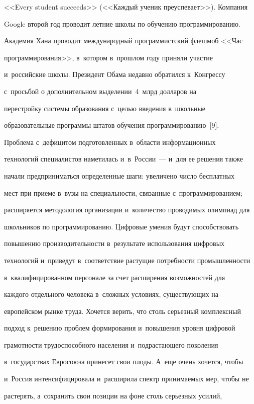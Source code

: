 <<Every student succeeds>> (<<Каждый ученик преуспевает>>). Компания 


Google второй год проводит летние школы по обучению программированию. 


Академия Хана проводит международный программистский флешмоб <<Час 


программирования>>, в~котором в~прошлом году приняли участие 


и~российские школы. Президент Обама недавно обратился к~Конгрессу 


с~просьбой о дополнительном выделении~4~млрд долларов на 


перестройку системы образования с~целью введения в~школьные 


образовательные программы штатов обучения программированию~[9]. 


Проблема с~дефицитом подготовленных в~области информационных 


технологий специалистов наметилась и~в~России~--- и~для ее решения также 


начали предприниматься определенные шаги: увеличено число бесплатных 


мест при приеме в~вузы на специальности, связанные с~программированием; 


расширяется методология организации и~количество проводимых олимпиад для 


школьников по программированию. Цифровые умения будут способствовать 


повышению производительности в~результате использования цифровых 


технологий и~приведут в~соответствие растущие потребности промышленности 


в~квалифицированном персонале за счет расширения возможностей для 


каждого отдельного человека в~сложных условиях, существующих на 


европейском рынке труда. Хочется верить, что столь серьезный комплексный 


подход к~решению проблем формирования и~повышения уровня цифровой 


грамотности трудоспособного населения и~подрастающего поколения 


в~государствах Евросоюза принесет свои плоды. А~еще очень хочется, чтобы 


и~Россия интенсифицировала и~расширила спектр принимаемых мер, чтобы не 


растерять, а~сохранить свои позиции на фоне столь серьезных усилий, 


